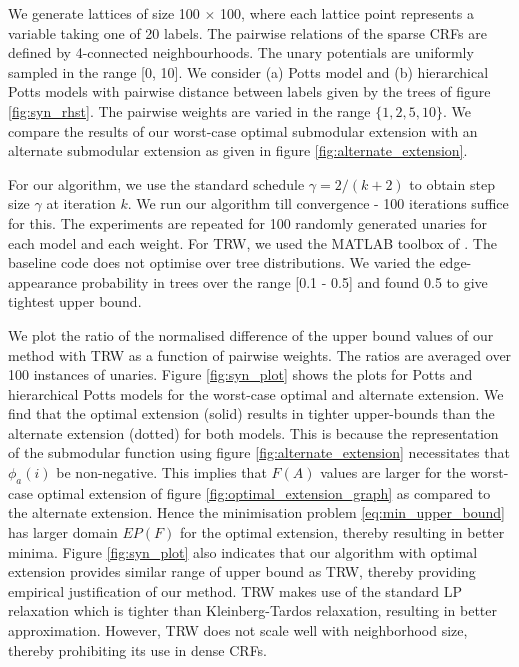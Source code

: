 \label{subsec:synthetic}
 We generate lattices of size 100 $\times$ 100, where each
lattice point represents a variable taking one of 20 labels. The pairwise
relations of the sparse CRFs are defined by 4-connected neighbourhoods. The
unary potentials are uniformly sampled in the range [0, 10]. We consider (a)
Potts model and (b) hierarchical Potts models with pairwise distance between
labels given by the trees of figure \ref{fig:syn_rhst}. The pairwise weights
are varied in the range $\{1, 2, 5, 10\}$. We compare the results of
our worst-case optimal submodular extension with an alternate submodular
extension as given in figure \ref{fig:alternate_extension}.

 For our algorithm, we use the standard schedule $\gamma = 2/(k + 2)$ to obtain step size $\gamma$ at iteration $k$. We run our algorithm till convergence - 100 iterations suffice for this. The experiments are repeated for 100 randomly generated unaries for each model and each weight. For TRW, we used the MATLAB toolbox of \citep{domke2013learning}. The baseline code does not optimise over tree distributions. We varied the edge-appearance probability in trees over the range [0.1 - 0.5] and found 0.5 to give tightest upper bound.

 We plot the ratio of the normalised difference of the upper
bound values of our method with TRW as a function of pairwise weights. The
ratios are averaged over 100 instances of unaries. Figure \ref{fig:syn_plot}
shows the plots for Potts and hierarchical Potts models for the worst-case
optimal and alternate extension. We find that the optimal extension (solid) results 
in tighter upper-bounds than the alternate extension (dotted) for both models.
This is because the representation of the submodular function using figure \ref{fig:alternate_extension} necessitates that $\phi_a(i)$ be non-negative. This implies that $F(A)$ values are larger
for the worst-case optimal extension of figure \ref{fig:optimal_extension_graph} as compared to the
alternate extension. Hence the minimisation problem \ref{eq:min_upper_bound}
has larger domain $EP(F)$ for the optimal extension, thereby resulting in better minima. Figure \ref{fig:syn_plot} also indicates that our algorithm with optimal extension provides similar range of upper bound as TRW, thereby providing empirical justification of our
method. TRW makes use of the standard LP relaxation \citep{chekuri2004linear} which is tighter than Kleinberg-Tardos relaxation, resulting in better approximation. However, TRW does not scale well with neighborhood size, thereby prohibiting its use in dense CRFs.

